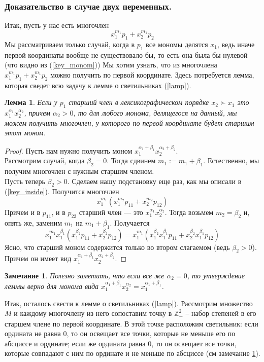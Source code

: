 \documentclass[12pt,a4paper]{article}
\newtheorem{remark}{Замечание}[section]
\newtheorem{lemma}{Лемма}[section]
\begin{document}
    \subsubsection{Доказательство в случае двух переменных.}
    Итак, пусть у нас есть многочлен $$x_1^{m_1}p_1+x_2^{m_1}p_2$$
    Мы рассматриваем только случай, когда в $p_1$ все мономы делятся $x_1$, ведь иначе первой координаты вообще не существовало бы, то есть она была бы нулевой (что видно из (\ref{key_monom}))
    Мы хотим узнать, что из многочлена $x_1^{m_1}p_1+x_2^{m_1}p_2$ можно получить по первой координате.
    Здесь потребуется лемма, которая сведет всю задачу к лемме о светильниках (\ref{lamp}).\vskip 0.1in\noindent
    \begin{lemma}
        Если у $p_1$ старший член в лексикографическом порядке $x_2\succ x_1$ это $x_1^{\alpha_1}x_2^{\alpha_2}$, причем $\alpha_2>0$, то для любого монома, делящегося на данный, мы можем получить многочлен, у которого по первой координате будет старшим этот моном.
    \end{lemma}
    \begin{proof}
        Пусть нам нужно получить моном $x_1^{\alpha_1+\beta_1}x_2^{\alpha_2+\beta_2}$.\\
        Рассмотрим случай, когда $\beta_2=0$. Тогда сдвинем $m_1:=m_1+\beta_1$. Естественно, мы получим многочлен с нужным старшим членом.\\
        Пусть теперь $\beta_2>0$. Сделаем нашу подстановку еще раз, как мы описали в (\ref{key_inside}). Получится многочлен
        $$x_1^{m_1}(x_1^{m_2} p_{11}+x_2^{m_2} p_{12})$$Причем и в $p_{11}$, и в $p_{22}$ старший член --- это $x_1^{\alpha_1}x_2^{\alpha_2}$.
        Тогда возьмем $m_2=\beta_2$ и, опять же, заменим $m_1$ на $m_1+ \beta_1$. Получается
        $$x_1^{m_1}x_1^{\beta_1}(x_1^{\beta_2} p_{11}+x_2^{\beta_2} p_{12})=x_1^{m_1}(x_1^{\beta_2}x_1^{\beta_1}p_{11}+x_2^{\beta_2}x_1^{\beta_1} p_{12})$$Ясно, что старший моном содержится только во втором слагаемом (ведь $\beta_2>0$). Причем он имеет вид $x_1^{\alpha_1+\beta_1}x_2^{\alpha_2+\beta_2}$.
    \end{proof}
    \begin{remark}
        \label{remark}
        Полезно заметить, что если все же $\alpha_2=0$, то утверждение леммы верно для монома вида $x_1^{\alpha_1+\beta_1}x_2^{\alpha_2}=x_1^{\alpha_1+\beta_1}$.
    \end{remark}
    \vskip 0.1in\noindent
    Итак, осталось свести к лемме о светильниках (\ref{lamp}). Рассмотрим множество $M$ и каждому многочлену из него сопоставим точку в $\mathbb{Z}_+^2$ -- набор степеней в его старшем члене по первой координате. В этой точке расположим светильник: если ордината не равна 0, то он освещает все точки, которые не меньше его по абсциссе и ординате; если же ордината равна 0, то он освещает все точки, которые совпадают с ним по ординате и не меньше по абсциссе (см замечание \ref{remark}).\\
\end{document}

